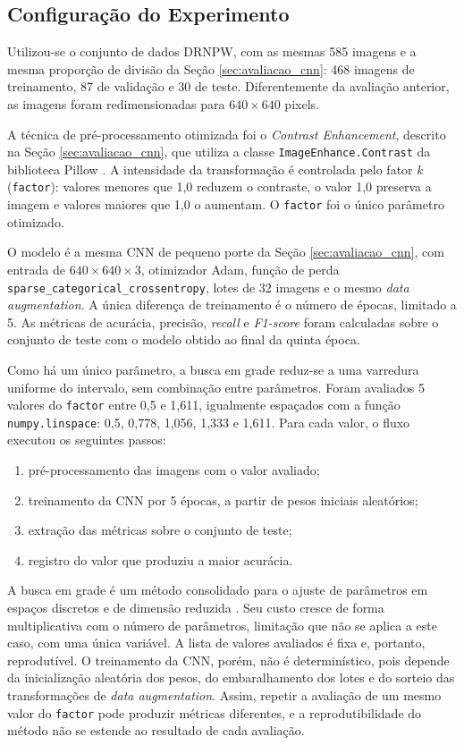 \subsection{Configuração do Experimento}

Utilizou-se o conjunto de dados DRNPW, com as mesmas 585 imagens e a mesma proporção de divisão da Seção \ref{sec:avaliacao_cnn}: 468 imagens de treinamento, 87 de validação e 30 de teste. Diferentemente da avaliação anterior, as imagens foram redimensionadas para $640 \times 640$ pixels.

A técnica de pré-processamento otimizada foi o \textit{Contrast Enhancement}, descrito na Seção \ref{sec:avaliacao_cnn}, que utiliza a classe \texttt{ImageEnhance.Contrast} da biblioteca Pillow \cite{clark2015pillow}. A intensidade da transformação é controlada pelo fator $k$ (\texttt{factor}): valores menores que 1,0 reduzem o contraste, o valor 1,0 preserva a imagem e valores maiores que 1,0 o aumentam. O \texttt{factor} foi o único parâmetro otimizado.

O modelo é a mesma CNN de pequeno porte da Seção \ref{sec:avaliacao_cnn}, com entrada de $640 \times 640 \times 3$, otimizador Adam, função de perda \texttt{sparse\_categorical\_crossentropy}, lotes de 32 imagens e o mesmo \textit{data augmentation}. A única diferença de treinamento é o número de épocas, limitado a 5. As métricas de acurácia, precisão, \textit{recall} e \textit{F1-score} foram calculadas sobre o conjunto de teste com o modelo obtido ao final da quinta época.

Como há um único parâmetro, a busca em grade reduz-se a uma varredura uniforme do intervalo, sem combinação entre parâmetros. Foram avaliados 5 valores do \texttt{factor} entre 0,5 e 1,611, igualmente espaçados com a função \texttt{numpy.linspace}: 0,5, 0,778, 1,056, 1,333 e 1,611. Para cada valor, o fluxo executou os seguintes passos:
\begin{enumerate}
    \item pré-processamento das imagens com o valor avaliado;
    \item treinamento da CNN por 5 épocas, a partir de pesos iniciais aleatórios;
    \item extração das métricas sobre o conjunto de teste;
    \item registro do valor que produziu a maior acurácia.
\end{enumerate}

A busca em grade é um método consolidado para o ajuste de parâmetros em espaços discretos e de dimensão reduzida \cite{bergstra2012random}. Seu custo cresce de forma multiplicativa com o número de parâmetros, limitação que não se aplica a este caso, com uma única variável. A lista de valores avaliados é fixa e, portanto, reprodutível. O treinamento da CNN, porém, não é determinístico, pois depende da inicialização aleatória dos pesos, do embaralhamento dos lotes e do sorteio das transformações de \textit{data augmentation}. Assim, repetir a avaliação de um mesmo valor do \texttt{factor} pode produzir métricas diferentes, e a reprodutibilidade do método não se estende ao resultado de cada avaliação.

